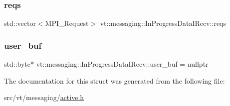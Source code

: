 \subsubsection{\texorpdfstring{reqs}{reqs}}
{\footnotesize\ttfamily std\+::vector$<$M\+P\+I\+\_\+\+Request$>$ vt\+::messaging\+::\+In\+Progress\+Data\+I\+Recv\+::reqs\hspace{0.3cm}{\ttfamily [private]}}

\mbox{\label{structvt_1_1messaging_1_1_in_progress_data_i_recv_affc7774716056ef55e65ebf8e288ac0f}} 
\subsubsection{\texorpdfstring{user\+\_\+buf}{user\_buf}}
{\footnotesize\ttfamily std\+::byte$\ast$ vt\+::messaging\+::\+In\+Progress\+Data\+I\+Recv\+::user\+\_\+buf = nullptr}



The documentation for this struct was generated from the following file\+:\begin{DoxyCompactItemize}
\item 
src/vt/messaging/\hyperlink{active_8h}{active.\+h}\end{DoxyCompactItemize}
